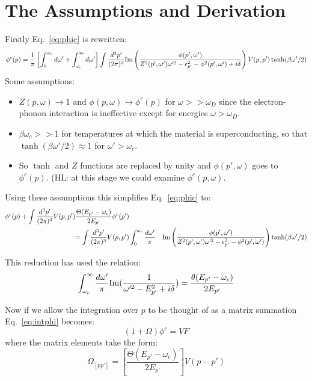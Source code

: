 \section{The Assumptions and Derivation}
%
Firstly Eq.~\ref{eq:phic} is rewritten:
%
\begin{eqnarray}
\label{eq:phic1}
\phi^{c}(p) = \frac{1}{\pi}\left[\int_{0}^{\omega_{c}} d\omega' + \int_{\omega_{c}}^{\infty} d\omega' \right]
\int \frac{d^{3} p'}{(2\pi)^{3}}{\rm Im}\left(\frac{\phi(p',\omega')}
{Z^{2}(p',\omega')\omega'^{2}-\epsilon_{p'}^{2}-\phi^{2}(p',\omega') +i\delta}\right)V(p,p')\tanh(\beta \omega'/2)
\end{eqnarray}
%
Some assumptions:
%
\begin{itemize}
\item $Z(p,\omega) \rightarrow 1$ and $\phi(p,\omega)\rightarrow \phi^{c}(p)$ for $\omega>>\omega_{D}$ since
the electron-phonon interaction is ineffective except for energies $\omega>\omega_{D}$.

\item $\beta\omega_{c}>>1$ for temperatures at which the material is superconducting, so that 
$\tanh(\beta\omega'/2)\approx 1$ for $\omega'>\omega_{c}$. 

\item So $\tanh$ and $Z$ functions are replaced by unity and $\phi(p',\omega)$ 
goes to $\phi^{c}(p)$. (HL: at this stage we could examine $\phi^{c}(p,\omega)$.
\end{itemize}
%
Using these assumptions this simplifies Eq.~\ref{eq:phic} to: 
%
\begin{align}
\label{eq:intphi}
\phi^{c}(p) + \int \frac{d^{3}p'}{(2\pi)^{3}}V(p,p')
\frac{\Theta(E_{p'}-\omega_{c})}{2E_{p'}}\phi^{c}(p') \nonumber & &\\
 = \int \frac{d^{3}p'}{(2\pi)^{3}}V(p,p') & \int_{0}^{\omega_{c}}\frac{d\omega'}{\pi} &
{\rm Im}\left(\frac{\phi(p',\omega')}{Z^{2}(p', \omega')\omega'^{2}-\epsilon^{2}_{p'}-\phi^{2}(p',\omega')}\right)\tanh(\beta\omega'/2)
\end{align}

This reduction has used the relation:
%
\begin{equation}
\label{eq:pair}
\int_{\omega_{c}}^{\infty} \frac{d\omega'}{\pi}{\rm Im} (\frac{1}{\omega'^{2}-E^{2}_{p'}+i\delta}) 
= \frac{\theta(E_{p'}-\omega_{c})}{2E_{p'}}
\end{equation}

Now if we allow the integration over $p$ to be thought of as a matrix summation
Eq.~\ref{eq:intphi} becomes:
%
\begin{equation}
\label{eq:matrixcoul}
(1+\Omega)\phi^{c}=VF
\end{equation}
%
where the matrix elements take the form:
%
\begin{equation}
\Omega_{[pp']} =  \left[\frac{\Theta(E_{p'}-\omega_{c})}{2E_{p'}}\right]V(p-p')
\end{equation}

